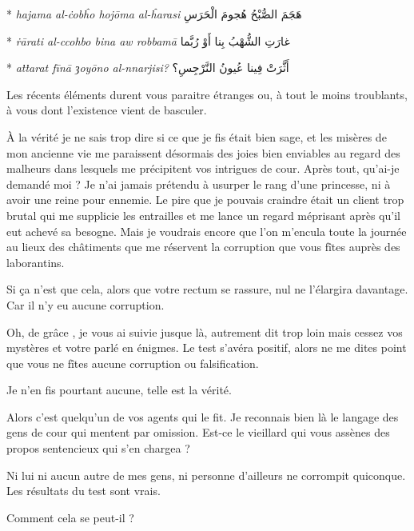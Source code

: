 \begin{drama}
\begin{paracol}{2}
      \switchcolumn[0]*
      \emph{hajama al-ċobĥo hojōma al-ĥarasi}
      \switchcolumn[1]
      \hfill\textarabic{هَجَمَ الصُّبْحُ هُجومَ الْحَرَسِ}
      
      \switchcolumn[0]*
      \emph{ṙārati al-ccohbo bina aw robbamā}
      \switchcolumn[1]
      \hfill\textarabic{غارَتِ الشُّهْبُ بِنا أَوْ رُبَّما}
      
      \switchcolumn[0]*
      \emph{aṫṫarat fīnā {\libertine{}ȝ}oyōno al-nnarjisi?}
      \switchcolumn[1]
      \hfill\textarabic{أَثَّرَتْ فِينا عُيونُ النَّرْجِسِ؟}
    \end{paracol}

   \elenaspeaks Les récents éléments durent vous paraitre étranges ou, à tout le moins troublants, à vous dont l’existence vient de basculer.

   \elaspeaks À la vérité je ne sais trop dire si ce que je fis était bien sage, et les misères de mon ancienne vie me paraissent désormais des joies bien enviables au regard des malheurs dans lesquels me précipitent vos intrigues de cour. Après tout, qu’ai-je demandé moi ? Je n’ai jamais prétendu à usurper le rang d’une princesse, ni à avoir une reine pour ennemie. Le pire que je pouvais craindre était un client trop brutal qui me supplicie les entrailles et me lance un regard méprisant après qu’il eut achevé sa besogne. 
   Mais je voudrais encore que l’on m’encula toute la journée au lieux des châtiments que me réservent la corruption que vous fîtes auprès des laborantins.

   \elenaspeaks Si ça n’est que cela, alors que votre rectum se rassure, nul ne l’élargira davantage. Car il n’y eu aucune corruption.

   \elaspeaks Oh, de grâce \elena, je vous ai suivie jusque là, autrement dit trop loin mais cessez vos mystères et votre parlé en énigmes. Le test s’avéra positif, alors ne me dites point que vous ne fîtes aucune corruption ou falsification.

   \elenaspeaks Je n’en fis pourtant aucune, telle est la vérité.

   \elaspeaks Alors c’est quelqu’un de vos agents qui le fit. Je reconnais bien là le langage des gens de cour qui mentent par omission. Est-ce le vieillard qui vous assènes des propos sentencieux qui s’en chargea ?

   \elenaspeaks Ni lui ni aucun autre de mes gens, ni personne d’ailleurs ne corrompit quiconque. Les résultats du test sont vrais.

   \elaspeaks Comment cela se peut-il ?


\end{drama}
